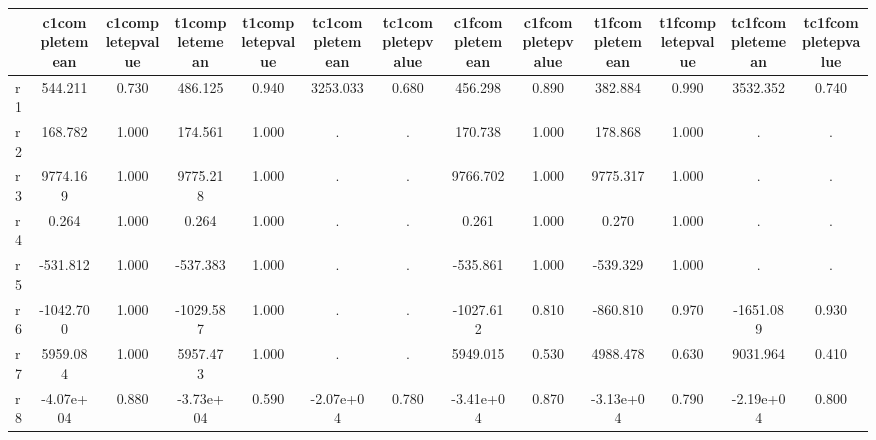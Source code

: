 \begin{table}[htbp]
\begin{tabular}{lcccccccccccc} \hline \hline
 & c1completemean  & c1completepvalue  & t1completemean  & t1completepvalue  & tc1completemean  & tc1completepvalue  & c1fcompletemean  & c1fcompletepvalue  & t1fcompletemean  & t1fcompletepvalue  & tc1fcompletemean  & tc1fcompletepvalue  \\  \hline 
r1 &   544.211 &     0.730 &   486.125 &     0.940 &  3253.033 &     0.680 &   456.298 &     0.890 &   382.884 &     0.990 &  3532.352 &     0.740 \\  
r2 &   168.782 &     1.000 &   174.561 &     1.000 &         . &         . &   170.738 &     1.000 &   178.868 &     1.000 &         . &         . \\  
r3 &  9774.169 &     1.000 &  9775.218 &     1.000 &         . &         . &  9766.702 &     1.000 &  9775.317 &     1.000 &         . &         . \\  
r4 &     0.264 &     1.000 &     0.264 &     1.000 &         . &         . &     0.261 &     1.000 &     0.270 &     1.000 &         . &         . \\  
r5 &  -531.812 &     1.000 &  -537.383 &     1.000 &         . &         . &  -535.861 &     1.000 &  -539.329 &     1.000 &         . &         . \\  
r6 & -1042.700 &     1.000 & -1029.587 &     1.000 &         . &         . & -1027.612 &     0.810 &  -860.810 &     0.970 & -1651.089 &     0.930 \\  
r7 &  5959.084 &     1.000 &  5957.473 &     1.000 &         . &         . &  5949.015 &     0.530 &  4988.478 &     0.630 &  9031.964 &     0.410 \\  
r8 & -4.07e+04 &     0.880 & -3.73e+04 &     0.590 & -2.07e+04 &     0.780 & -3.41e+04 &     0.870 & -3.13e+04 &     0.790 & -2.19e+04 &     0.800 \\  
\hline \hline \end{tabular}
\end{table}
